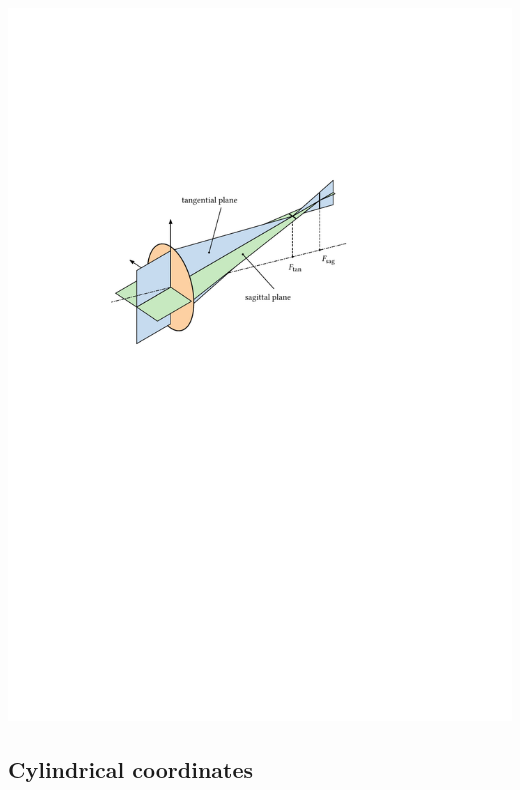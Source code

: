 \documentclass[11pt,a4paper]{article}
\begin{document}
\begin{center}
\includegraphics[scale=1]{pdf/examples/astigmatismus.pdf}
\end{center}



\subsection{Cylindrical coordinates}
\end{document}
